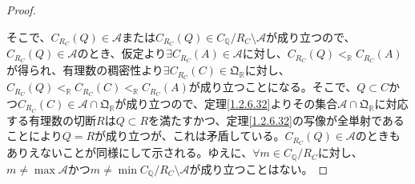 \documentclass[dvipdfmx]{jsarticle}
\begin{document}
\begin{proof}
\begin{itemize}
\end{itemize}
そこで、$C_{R_{C}}(Q)\in \mathcal{A}$または$C_{R_{C}}(Q) \in C_{\mathbb{Q}} /R_{C} \mathcal{\setminus A}$が成り立つので、$C_{R_{C}}(Q)\in \mathcal{A}$のとき、仮定より$\exists C_{R_{C}}(A)\in \mathcal{A}$に対し、$C_{R_{C}}(Q) <_{\mathbb{R}}C_{R_{C}}(A)$が得られ、有理数の稠密性より$\exists C_{R_{C}}(C) \in \mathfrak{Q}_{\mathbb{R}}$に対し、$C_{R_{C}}(Q) <_{\mathbb{R}}C_{R_{C}}(C) <_{\mathbb{R}}C_{R_{C}}(A)$が成り立つことになる。そこで、$Q \subset C$かつ$C_{R_{C}}(C)\in \mathcal{A \cap}\mathfrak{Q}_{\mathbb{R}}$が成り立つので、定理\ref{1.2.6.32}よりその集合$\mathcal{A \cap}\mathfrak{Q}_{\mathbb{R}}$に対応する有理数の切断$R$は$Q \subset R$を満たすかつ、定理\ref{1.2.6.32}の写像が全単射であることにより$Q = R$が成り立つが、これは矛盾している。$C_{R_{C}}(Q)\in \mathcal{A}$のときもありえないことが同様にして示される。ゆえに、$\forall m \in C_{\mathbb{Q}} /R_{C} $に対し、$m \neq \max\mathcal{A}$かつ$m \neq \min{C_{\mathbb{Q}} /R_{C} \mathcal{\setminus A}}$が成り立つことはない。
\end{proof}
\end{document}
